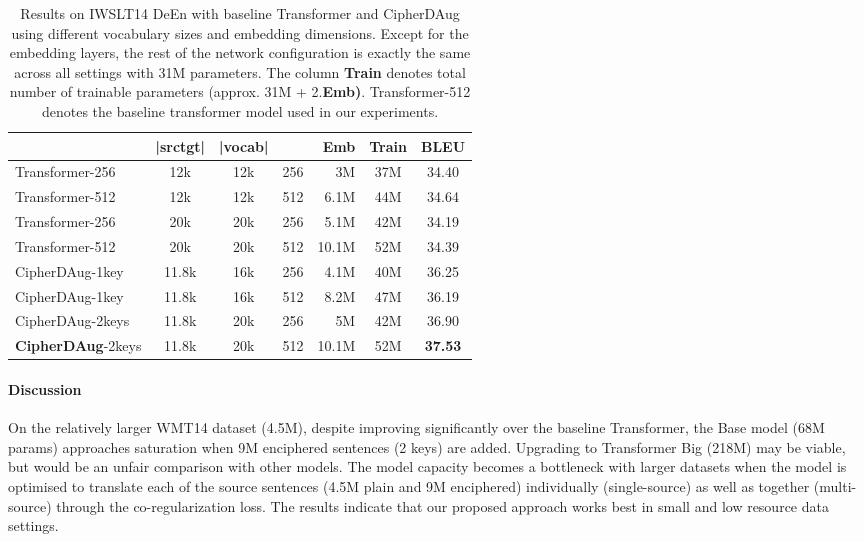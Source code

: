 \documentclass[11pt]{article}
\begin{document}
\begin{table*}[!t]
\small
\centering
\begin{tabular}{lcc|crc|c}
\toprule
 & \textbf{|srctgt|} & \textbf{|vocab|} & \textbf{} & \textbf{Emb } & \textbf{Train} & \textbf{BLEU} \\ \midrule
Transformer-256  & 12k & 12k & 256 & 3M & 37M & 34.40 \\
\cellcolor[HTML]{E8ECED}Transformer-512  & \cellcolor[HTML]{E8ECED}12k & \cellcolor[HTML]{E8ECED}12k & \cellcolor[HTML]{E8ECED}512 & \cellcolor[HTML]{E8ECED}6.1M & \cellcolor[HTML]{E8ECED}44M & \cellcolor[HTML]{E8ECED}34.64 \\
Transformer-256  & 20k & 20k & 256 & 5.1M & 42M & 34.19 \\
Transformer-512  & 20k & 20k & 512 & 10.1M & 52M & 34.39 \\ \midrule
CipherDAug-1key & 11.8k & 16k & 256 & 4.1M & 40M & 36.25 \\
CipherDAug-1key & 11.8k & 16k & 512 & 8.2M & 47M & 36.19 \\ \midrule
CipherDAug-2keys & 11.8k & 20k & 256 & 5M & 42M & 36.90 \\
\textbf{CipherDAug}-2keys & 11.8k & 20k & 512 & 10.1M & 52M & \textbf{37.53} \\
\bottomrule
\end{tabular}
\caption{Results on IWSLT14 DeEn with baseline Transformer and CipherDAug using different vocabulary sizes and embedding dimensions. Except for the embedding layers, the rest of the network configuration is exactly the same across all settings with 31M parameters. The column \textbf{Train} denotes total number of trainable parameters (approx. 31M + 2.\textbf{Emb)}. Transformer-512 denotes the baseline transformer model used in our experiments.}
\label{tab:vocab_compare}
\end{table*}

\paragraph{Discussion} On the relatively larger WMT14 dataset (4.5M), despite improving significantly over the baseline Transformer, the Base model (68M params) approaches saturation when 9M enciphered sentences (2 keys) are added. Upgrading to Transformer Big (218M) may be viable, but would be an unfair comparison with other models.
The model capacity becomes a bottleneck with larger datasets when the model is optimised to translate each of the source sentences (4.5M plain and 9M enciphered) individually (single-source) as well as together (multi-source) through the co-regularization loss. 
The results indicate that our proposed approach works best in small and low resource data settings. 
\end{document}
